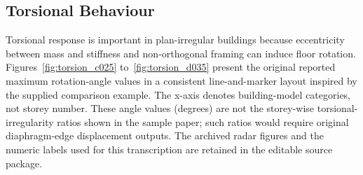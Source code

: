 \subsection{Torsional Behaviour}
Torsional response is important in plan-irregular buildings because eccentricity between mass and stiffness and non-orthogonal framing can induce floor rotation. Figures~\ref{fig:torsion_c025} to~\ref{fig:torsion_d035} present the original reported maximum rotation-angle values in a consistent line-and-marker layout inspired by the supplied comparison example. The x-axis denotes building-model categories, not storey number. These angle values (degrees) are not the storey-wise torsional-irregularity ratios shown in the sample paper; such ratios would require original diaphragm-edge displacement outputs. The archived radar figures and the numeric labels used for this transcription are retained in the editable source package.

